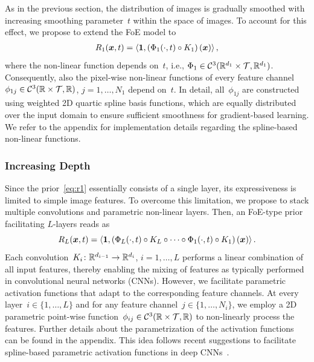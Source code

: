\documentclass{article} %
\theoremstyle{plain}
\theoremstyle{definition}
\theoremstyle{remark}
\newcommand{\C}{\mathcal{C}}
\newcommand{\T}{\mathcal{T}}
\newcommand{\scal}[2]{\left\langle#1,#2\right\rangle}
\renewcommand{\vec}[1]{\mathbf{#1}}
\begin{document}
As in the previous section, the distribution of images is gradually smoothed with increasing smoothing parameter~$t$ within the space of images.
To account for this effect, we propose to extend the FoE model to
\begin{align}\label{eq:r1}
R_1(\vx,t) = \scal{\vec{1}}{\left(\Phi_1(\cdot, t) \circ K_1\right)(\vx)},
\end{align}
where the non-linear function depends on~$t$, i.e., $\Phi_1\in\C^3(\R^{d_1}\times\T,\R^{d_1})$.
Consequently, also the pixel-wise non-linear functions of every feature channel~$\phi_{1j}\in\C^3(\R\times\T,\R)$, $j=1,\ldots,N_1$ depend on~$t$. 
In detail, all~$\phi_{1j}$ are constructed using weighted 2D quartic spline basis functions, which are equally distributed over the input domain to ensure sufficient smoothness for gradient-based learning.
We refer to the appendix for implementation details regarding the spline-based non-linear functions.

\subsubsection{Increasing Depth}
Since the prior~\eqref{eq:r1} essentially consists of a single layer, its expressiveness is limited to simple image features.
To overcome this limitation, we propose to stack multiple convolutions and parametric non-linear layers.
Then, an FoE-type prior facilitating $L$-layers reads as
\[
R_L(\vx,t) = \scal{\vec{1}}{\left(\Phi_L(\cdot,t)\circ K_L\circ\cdots\circ\Phi_1(\cdot, t) \circ K_1\right)(\vx)}.
\]
Each convolution~$K_i\colon\mathbb{R}^{d_{i-1}}\to\mathbb{R}^{d_i}$, $i=1,\ldots,L$ performs a linear combination of all input features, thereby enabling the mixing of features as typically performed in convolutional neural networks (CNNs).
However, we facilitate parametric activation functions that adapt to the corresponding feature channels.
At every layer~$i\in\{1,\ldots,L\}$ and for any feature channel~$j\in\{1,\ldots,N_i\}$, we employ a 2D parametric point-wise function~$\phi_{ij}\in\C^3(\R\times\T,\R)$ to non-linearly process the features.
Further details about the parametrization of the activation functions can be found in the appendix.
This idea follows recent suggestions to facilitate spline-based parametric activation functions in deep CNNs~\citep{OcMe18,AzGu20}.
\end{document}
